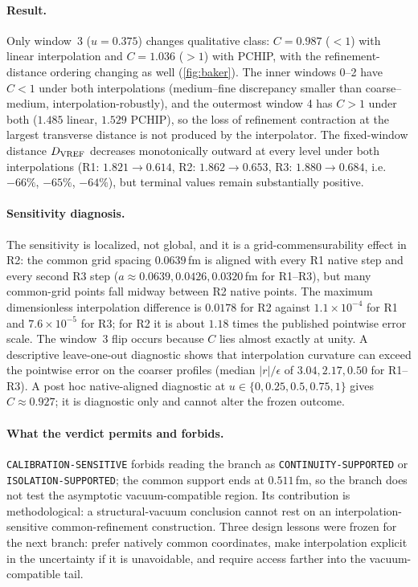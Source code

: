 \documentclass[11pt,a4paper]{article}
\theoremstyle{definition}
\theoremstyle{remark}
\begin{document}
\paragraph{Result.} Only window~3 ($u=0.375$) changes qualitative class: $C=0.987$ ($<1$) with linear interpolation and $C=1.036$ ($>1$) with PCHIP, with the refinement-distance ordering changing as well (\cref{fig:baker}). The inner windows 0--2 have $C<1$ under both interpolations (medium--fine discrepancy smaller than coarse--medium, interpolation-robustly), and the outermost window 4 has $C>1$ under both ($1.485$ linear, $1.529$ PCHIP), so the loss of refinement contraction at the largest transverse distance is not produced by the interpolator. The fixed-window distance $D_{\rm VREF}$ decreases monotonically outward at every level under both interpolations (R1: $1.821\to0.614$, R2: $1.862\to0.653$, R3: $1.880\to0.684$, i.e.\ $-66\%$, $-65\%$, $-64\%$), but terminal values remain substantially positive.
\paragraph{Sensitivity diagnosis.} The sensitivity is localized, not global, and it is a grid-commensurability effect in R2: the common grid spacing $0.0639$\,fm is aligned with every R1 native step and every second R3 step ($a\approx0.0639,0.0426,0.0320$\,fm for R1--R3), but many common-grid points fall midway between R2 native points. The maximum dimensionless interpolation difference is $0.0178$ for R2 against $1.1\times10^{-4}$ for R1 and $7.6\times10^{-5}$ for R3; for R2 it is about $1.18$ times the published pointwise error scale. The window~3 flip occurs because $C$ lies almost exactly at unity. A descriptive leave-one-out diagnostic shows that interpolation curvature can exceed the pointwise error on the coarser profiles (median $|r|/\epsilon$ of $3.04,2.17,0.50$ for R1--R3). A post hoc native-aligned diagnostic at $u\in\{0,0.25,0.5,0.75,1\}$ gives $C\approx0.927$; it is diagnostic only and cannot alter the frozen outcome.
\paragraph{What the verdict permits and forbids.} \texttt{CALIBRATION-\allowbreak{}SENSITIVE} forbids reading the branch as \texttt{CONTINUITY-\allowbreak{}SUPPORTED} or \texttt{ISOLATION-\allowbreak{}SUPPORTED}; the common support ends at $0.511$\,fm, so the branch does not test the asymptotic vacuum-compatible region. Its contribution is methodological: a structural-vacuum conclusion cannot rest on an interpolation-sensitive common-refinement construction. Three design lessons were frozen for the next branch: prefer natively common coordinates, make interpolation explicit in the uncertainty if it is unavoidable, and require access farther into the vacuum-compatible tail.
\end{document}
